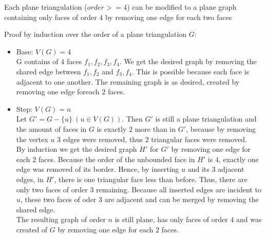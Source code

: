 \documentclass[a4paper]{article}
\begin{document}
	\begin{solution}{19}
			\begin{theorem} {Each plane triangulation ($order >= 4$) can be modified to a plane graph containing only faces of order $4$ by removing one edge for each two faces}
				
				Proof by induction over the order of a plane triangulation $G$:\\
				\begin{itemize}
					\item Base: $V(G)=4$\\
						G contains of $4$ faces $f_1,f_2,f_3,f_4$. We get the desired graph by removing the shared edge between $f_1, f_2$ and $f_3, f_4$.
						This is possible because each face is adjacent to one another. The remaining graph is as desired, created by removing one edge foreach $2$ faces.
						
					\item {Step: $V(G)=n$}\\
						Let $G' = G -\{u\} ~ (u \in V(G))$. Then $G'$ is still a plane triangulation and the amount of faces in $G$ is exactly $2$ more than in $G'$, because by removing the vertex $u$ $3$ edges were removed, thus $2$ triangular faces were removed.\\
						By induction we get the desired graph $H'$ for $G'$ by removing one edge for each $2$ faces. Because the order of the unbounded face in $H'$ is $4$, exactly one edge was removed of its border. Hence, by inserting $u$ and its $3$ adjacent edges, in $H'$, there is one triangular face less than before. Thus, there are only two faces of order $3$ remaining. Because all inserted edges are incident to $u$, these two faces of oder $3$ are adjacent and can be merged by removing the shared edge.\\
						The resulting graph of order $n$ is still plane, has only faces of order $4$ and was created of $G$ by removing one edge for each $2$ faces. 
					
				\end{itemize}
			
			\end{theorem}
		

\end{solution}
\end{document}
